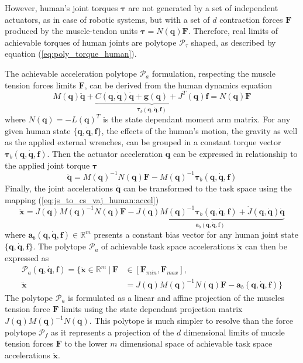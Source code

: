 However, human's joint torques $\bm{\tau}$ are not generated by a set of independent actuators, as in case of robotic systems, but with a set of $d$ contraction forces $\bm{F}$ produced by the muscle-tendon units $\bm{\tau}=N(\bm{q}) \bm{F}$. Therefore, real limits of achievable torques of human joints are polytope $\mathcal{P}_\tau$ shaped, as described by equation (\ref{eq:poly_torque_human}). 

The achievable acceleration polytope $\mathcal{P}_a$ formulation, respecting the muscle tension forces limits $\bm{F}$, can be derived from the human dynamics equation
\begin{equation}
M(\bm{q})\ddot{\bm{q}} + \underbrace{C(\bm{q},\dot{\bm{q}})\dot{\bm{q}} + \bm{g}(\bm{q}) + J^T(\bm{q})\bm{f}}_{\bm{\tau}_b(\bm{q},\dot{\bm{q}}, \bm{f})} = N(\bm{q}) \bm{F} 
\end{equation}
where $N(\bm{q})=-L(\bm{q})^T$ is the state dependant moment arm matrix. 
For any given human state $\{\bm{q},\dot{\bm{q}}, \bm{f}\}$, the effects of the human's motion, the gravity as well as the applied external wrenches, can be grouped in a constant torque vector $\bm{\tau}_b(\bm{q},\dot{\bm{q}},\bm{f})$. Then the actuator acceleration $\bm{q}$ can be expressed in relationship to the applied joint torque $\bm{\tau}$
\begin{equation}
    \ddot{\bm{q}} = M(\bm{q})^{-1}N(\bm{q})\bm{F} - M(\bm{q})^{-1}\bm{\tau}_b(\bm{q},\dot{\bm{q}}, \bm{f})
\end{equation}
Finally, the joint accelerations $\ddot{\bm{q}}$ can be transformed to the task space using the mapping (\ref{eq:js_to_cs_vaj_human:accel})
\begin{equation}
    \ddot{\bm{x}} = J(\bm{q})M(\bm{q})^{-1}N(\bm{q})\bm{F} - \underbrace{J(\bm{q})M(\bm{q})^{-1}\bm{\tau}_b(\bm{q},\dot{\bm{q}},\bm{f}) + \dot{J}(\bm{q}, \dot{\bm{q}})\dot{\bm{q}}}_{\bm{a}_b(\bm{q},\dot{\bm{q}},\bm{f})}
\end{equation}
where $\bm{a}_b(\bm{q},\dot{\bm{q}},\bm{f}) \in \mathbb{R}^m$ presents a constant bias vector for any human joint state $\{\bm{q},\dot{\bm{q}},\bm{f}\}$. The polytope $\mathcal{P}_a$ of achievable task space accelerations $\ddot{\bm{x}}$ can then be expressed as
\begin{equation}
\begin{split}
    \mathcal{P}_a(\bm{q},\dot{\bm{q}},\bm{f}) = \{ \ddot{\bm{x}} \in \mathbb{R}^m ~|~ \bm{F}&\in\left[\bm{F}_{min}, \bm{F}_{max} \right],\\ \ddot{\bm{x}} &= J(\bm{q})M(\bm{q})^{-1}N(\bm{q})\bm{F} - \bm{a}_b(\bm{q},\dot{\bm{q}},\bm{f}) \}
\end{split}
\end{equation}
The polytope $\mathcal{P}_a$ is formulated as a linear and affine projection of the muscles tension force $\bm{F}$ limits using the state dependant projection matrix $J(\bm{q})M(\bm{q})^{-1}N(\bm{q})$.  This polytope is much simpler to resolve than the force polytope $\mathcal{P}_f$ as it represents a projection of the $d$ dimensional limits of mucsle tension forces $\bm{F}$ to the lower $m$ dimensional space of achievable task space accelerations $\ddot{\bm{x}}$.


